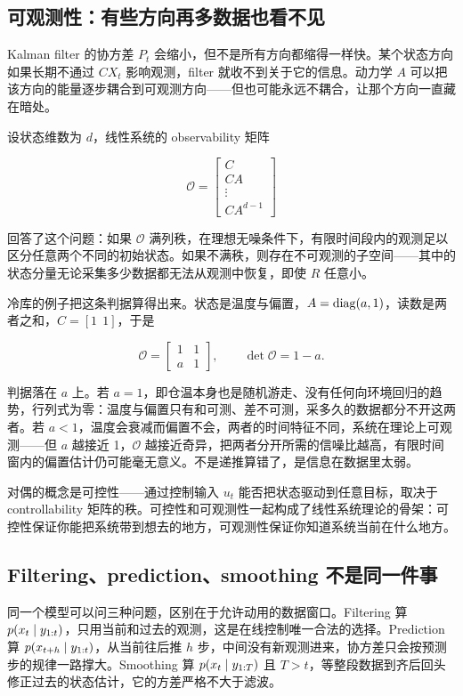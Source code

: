 \subsection{可观测性：有些方向再多数据也看不见}

Kalman filter 的协方差 \(P_t\) 会缩小，但不是所有方向都缩得一样快。某个状态方向如果长期不通过 \(C X_t\) 影响观测，filter 就收不到关于它的信息。动力学 \(A\) 可以把该方向的能量逐步耦合到可观测方向——但也可能永远不耦合，让那个方向一直藏在暗处。

设状态维数为 \(d\)，线性系统的 observability 矩阵

\[
\mathcal{O} =
\begin{bmatrix}
C \\ CA \\ \vdots \\ CA^{d-1}
\end{bmatrix}
\]

回答了这个问题：如果 \(\mathcal{O}\) 满列秩，在理想无噪条件下，有限时间段内的观测足以区分任意两个不同的初始状态。如果不满秩，则存在不可观测的子空间——其中的状态分量无论采集多少数据都无法从观测中恢复，即使 \(R\) 任意小。

冷库的例子把这条判据算得出来。状态是温度与偏置，\(A = \operatorname{diag}(a, 1)\)，读数是两者之和，\(C = [1\ \ 1]\)，于是

\[
\mathcal{O} = \begin{bmatrix} 1 & 1 \\ a & 1 \end{bmatrix},
\qquad
\det \mathcal{O} = 1 - a .
\]

判据落在 \(a\) 上。若 \(a = 1\)，即仓温本身也是随机游走、没有任何向环境回归的趋势，行列式为零：温度与偏置只有和可测、差不可测，采多久的数据都分不开这两者。若 \(a < 1\)，温度会衰减而偏置不会，两者的时间特征不同，系统在理论上可观测——但 \(a\) 越接近 1，\(\mathcal{O}\) 越接近奇异，把两者分开所需的信噪比越高，有限时间窗内的偏置估计仍可能毫无意义。不是递推算错了，是信息在数据里太弱。

对偶的概念是可控性——通过控制输入 \(u_t\) 能否把状态驱动到任意目标，取决于 controllability 矩阵的秩。可控性和可观测性一起构成了线性系统理论的骨架：可控性保证你能把系统带到想去的地方，可观测性保证你知道系统当前在什么地方。

\subsection{Filtering、prediction、smoothing 不是同一件事}

同一个模型可以问三种问题，区别在于允许动用的数据窗口。Filtering 算 \(p(x_t \mid y_{1:t})\)，只用当前和过去的观测，这是在线控制唯一合法的选择。Prediction 算 \(p(x_{t+h} \mid y_{1:t})\)，从当前往后推 \(h\) 步，中间没有新观测进来，协方差只会按预测步的规律一路撑大。Smoothing 算 \(p(x_t \mid y_{1:T})\) 且 \(T > t\)，等整段数据到齐后回头修正过去的状态估计，它的方差严格不大于滤波。

